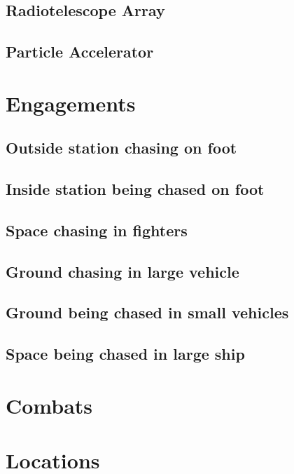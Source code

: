 \documentclass[a4paper]{article}
\begin{document}
\subsection{Radiotelescope Array}

\subsection{Particle Accelerator}


\section{Engagements}

\subsection{Outside station chasing on foot}

\subsection{Inside station being chased on foot}

\subsection{Space chasing in fighters}

\subsection{Ground chasing in large vehicle}

\subsection{Ground being chased in small vehicles}

\subsection{Space being chased in large ship}


\section{Combats}

\section{Locations}
\end{document}
